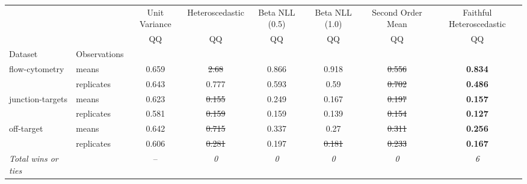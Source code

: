 \begin{tabular}{ll|c|c|c|c|c|c}
\toprule
{} & {} & {Unit Variance} & {Heteroscedastic} & {Beta NLL (0.5)} & {Beta NLL (1.0)} & {Second Order Mean} & {Faithful Heteroscedastic} \\
{} & {} & {QQ} & {QQ} & {QQ} & {QQ} & {QQ} & {QQ} \\
{Dataset} & {Observations} & {} & {} & {} & {} & {} & {} \\
\midrule
\multirow[t]{2}{*}{flow-cytometry} & means & 0.659 & \sout{2.68} & 0.866 & 0.918 & \sout{0.556} & \textbf{0.834} \\
 & replicates & 0.643 & 0.777 & 0.593 & 0.59 & \sout{0.702} & \textbf{0.486} \\
\multirow[t]{2}{*}{junction-targets} & means & 0.623 & \sout{0.155} & 0.249 & 0.167 & \sout{0.197} & \textbf{0.157} \\
 & replicates & 0.581 & \sout{0.159} & 0.159 & 0.139 & \sout{0.154} & \textbf{0.127} \\
\multirow[t]{2}{*}{off-target} & means & 0.642 & \sout{0.715} & 0.337 & 0.27 & \sout{0.311} & \textbf{0.256} \\
 & replicates & 0.606 & \sout{0.281} & 0.197 & \sout{0.181} & \sout{0.233} & \textbf{0.167} \\
\textit{{Total wins or ties}} &  & -- & \textit{0} & \textit{0} & \textit{0} & \textit{0} & \textit{6} \\
\bottomrule
\end{tabular}
